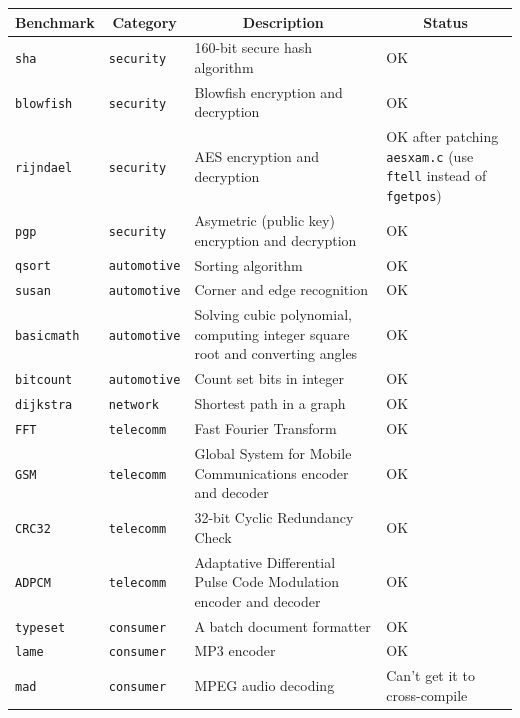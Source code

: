 \begin{table}[p]
	\begin{center}
		\begin{tabular}{|l|l|p{5cm}|p{5cm}|}
		\hline
		\multicolumn{1}{|c|}{\textbf{Benchmark}} & \multicolumn{1}{|c|}{\textbf{Category}} & \multicolumn{1}{|c|}{\textbf{Description}} & \multicolumn{1}{|c|}{\textbf{Status}}\\
		\hline
		\texttt{sha} & \texttt{security} & 160-bit secure hash algorithm & OK \\
		\hline
		\texttt{blowfish} & \texttt{security} & Blowfish encryption and decryption & OK \\
		\hline
		\texttt{rijndael} & \texttt{security} & AES encryption and decryption & OK after patching \texttt{aesxam.c} (use \texttt{ftell} instead of \texttt{fgetpos})\\
		\hline
		\texttt{pgp} & \texttt{security} & Asymetric (public key) encryption and decryption & OK \\
		\hline
		\texttt{qsort} & \texttt{automotive} & Sorting algorithm & OK \\
		\hline
		\texttt{susan} & \texttt{automotive} & Corner and edge recognition & OK \\
		\hline
		\texttt{basicmath} & \texttt{automotive} & Solving cubic polynomial, computing integer square root and converting angles & OK \\
		\hline
		\texttt{bitcount} & \texttt{automotive} & Count set bits in integer & OK \\
		\hline
		\texttt{dijkstra} & \texttt{network} & Shortest path in a graph & OK \\
		\hline
		\texttt{FFT} & \texttt{telecomm} & Fast Fourier Transform & OK \\
		\hline
		\texttt{GSM} & \texttt{telecomm} & Global System for Mobile Communications encoder and decoder & OK \\
		\hline
		\texttt{CRC32} & \texttt{telecomm} & 32-bit Cyclic Redundancy Check & OK \\
		\hline
		\texttt{ADPCM} & \texttt{telecomm} & Adaptative Differential Pulse Code Modulation encoder and decoder & OK \\
		\hline
		\texttt{typeset} & \texttt{consumer} & A batch document formatter & OK \\
		\hline
		\texttt{lame} & \texttt{consumer} & MP3 encoder & OK \\
		\hline
		\texttt{mad} & \texttt{consumer} & MPEG audio decoding & Can't get it to cross-compile \\

\end{tabular}
\end{center}
\end{table}
